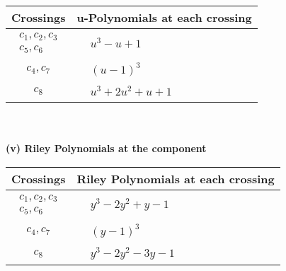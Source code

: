 \documentclass[1p]{elsarticle_modified}
\theoremstyle{definition}
\begin{document}
\begin{tabular}{m{50pt}|m{274pt}}
Crossings & \hspace{64pt}u-Polynomials at each crossing \\
\hline $$\begin{aligned}c_{1},c_{2},c_{3}\\c_{5},c_{6}\end{aligned}$$&$\begin{aligned}
&u^3- u+1
\end{aligned}$\\
\hline $$\begin{aligned}c_{4},c_{7}\end{aligned}$$&$\begin{aligned}
&(u-1)^3
\end{aligned}$\\
\hline $$\begin{aligned}c_{8}\end{aligned}$$&$\begin{aligned}
&u^3+2 u^2+u+1
\end{aligned}$\\
\hline
\end{tabular}\\~\\
\newpage\renewcommand{\arraystretch}{1}
\flushleft \textbf{(v) Riley Polynomials at the component}\newline \\
\begin{tabular}{m{50pt}|m{274pt}}
Crossings & \hspace{64pt}Riley Polynomials at each crossing \\
\hline $$\begin{aligned}c_{1},c_{2},c_{3}\\c_{5},c_{6}\end{aligned}$$&$\begin{aligned}
&y^3-2 y^2+y-1
\end{aligned}$\\
\hline $$\begin{aligned}c_{4},c_{7}\end{aligned}$$&$\begin{aligned}
&(y-1)^3
\end{aligned}$\\
\hline $$\begin{aligned}c_{8}\end{aligned}$$&$\begin{aligned}
&y^3-2 y^2-3 y-1
\end{aligned}$\\
\hline
\end{tabular}\\~\\
\end{document}
